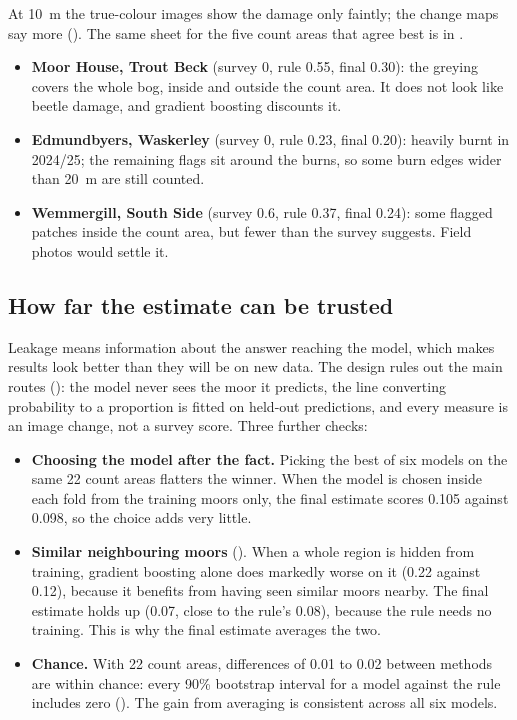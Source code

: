 \documentclass[11pt,a4paper]{article}
\begin{document}
At 10~m the true-colour images show the damage only faintly; the change maps say more (). The same sheet for the five count areas that agree best is in .
\begin{itemize}
\item \textbf{Moor House, Trout Beck} (survey 0, rule 0.55, final 0.30): the greying covers the whole bog, inside and outside the count area. It does not look like beetle damage, and gradient boosting discounts it.
\item \textbf{Edmundbyers, Waskerley} (survey 0, rule 0.23, final 0.20): heavily burnt in 2024/25; the remaining flags sit around the burns, so some burn edges wider than 20~m are still counted.
\item \textbf{Wemmergill, South Side} (survey 0.6, rule 0.37, final 0.24): some flagged patches inside the count area, but fewer than the survey suggests. Field photos would settle it.
\end{itemize}

\subsection{How far the estimate can be trusted}\label{sec:trust}

Leakage means information about the answer reaching the model, which makes results look better than they will be on new data. The design rules out the main routes (): the model never sees the moor it predicts, the line converting probability to a proportion is fitted on held-out predictions, and every measure is an image change, not a survey score. Three further checks:

\begin{itemize}
\item \textbf{Choosing the model after the fact.} Picking the best of six models on the same 22 count areas flatters the winner. When the model is chosen inside each fold from the training moors only, the final estimate scores 0.105 against 0.098, so the choice adds very little.
\item \textbf{Similar neighbouring moors} (). When a whole region is hidden from training, gradient boosting alone does markedly worse on it (0.22 against 0.12), because it benefits from having seen similar moors nearby. The final estimate holds up (0.07, close to the rule's 0.08), because the rule needs no training. This is why the final estimate averages the two.
\item \textbf{Chance.} With 22 count areas, differences of 0.01 to 0.02 between methods are within chance: every 90\% bootstrap interval for a model against the rule includes zero (). The gain from averaging is consistent across all six models.
\end{itemize}
\end{document}
